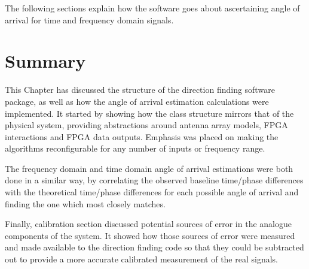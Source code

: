 The following sections explain how the software goes about ascertaining angle of arrival for time and frequency domain signals.





\section{Summary}
This Chapter has discussed the structure of the direction finding software package, as well as how the angle of arrival estimation calculations were implemented. It started by showing how the class structure mirrors that of the physical system, providing abstractions around antenna array models, FPGA interactions and FPGA data outputs. Emphasis was placed on making the algorithms reconfigurable for any number of inputs or frequency range.

The frequency domain and time domain angle of arrival estimations were both done in a similar way, by correlating the observed baseline time/phase differences with the theoretical time/phase differences for each possible angle of arrival and finding the one which most closely matches. 

Finally, calibration section discussed potential sources of error in the analogue components of the system. It showed how those sources of error were measured and made available to the direction finding code so that they could be subtracted out to provide a more accurate calibrated measurement of the real signals.
